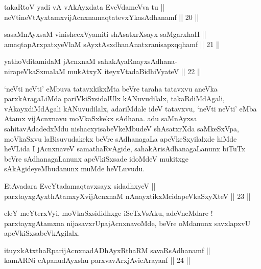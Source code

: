\begin{shl}
takaRtoV yadi vA vAkAyxdata EveVdameVva tu || \\
neVtineVtAyxtamxvijAcnxnamaqtatevxYkasAdhanamf \hfill || 20 || 
\end{shl}
				
\begin{shl}
sasaMnAyxsaM vinishecxVyamiti shAsatxrXsayx saMgarxhaH || \\
amaqtapArxpatxyeV\s laM sAyxtAsxdhanAnatxranisapxqqhamf \hfill || 21 ||  
\end{shl}
				
\begin{shl}
yathoVditamidaM jAcnxnaM sahakAyaRnayxsAdhana-\\
nirapeVkaSxmalaM mukAtxyX iteyxVtadaBidhiVyateV \hfill || 22 ||  
\end{shl}

\begin{artha}
`neVti neVti' eMbuva tatavxkikxMta beVre taraha tatavxvu aneVka parxkAragaLiMda pariVkiSxsidalUlx kANuvudilalx, takaRdiMdAgali, vAkayxdiMdAgali kANuvudilalx, adariMdale ideV tatavxvu, `neVti neVti' eMba Atamx vijAcnxnavu moVkaSxkekx sAdhana. adu saMnAyxsa sahitavAdadedxMdu nishacxyisabeVkeMbudeV shAsatxrXda saMkeSxVpa, moVkaSxvu laBisuvudakekx beVre sAdhanagaLa apeVkeSxyilalxde hiMde heVLida I jAcnxnaveV samathaRvAgide, sahakArisAdhanagaLanunx biTuTx beVre sAdhanagaLanunx apeVkiSxsade idoMdeV mukitxge sAkAgideyeMbudanunx muMde heVLuvudu.
\end{artha}


\begin{shl}
EtAvadara EveYtadamaqtavxsayx sidadhxyeV || \\
parxtayxgAyxthAtamxyXvijAcnxnaM nAnayxtikxMcidapeVkaSxyXteV \hfill || 23 ||  
\end{shl}

\begin{artha}
eleY meYterxVyi, moVkaSxsididhxge iSeTxVsAku, adeVneMdare ! parxtayxgAtamxna nijasavxrUpajAcnxnavoMde, beVre oMdanunx savxlapxvU apeVkiSxsabeVkAgilalx.
\end{artha}


\begin{shl}
ituyxkAtxthaRparijAcnxnadADhAyxRthaRM savaRsAdhanamf || \\
kamARNi cApanudAyx\s \s shu parxvavArxjAvicArayanf \hfill || 24 ||  
\end{shl}

